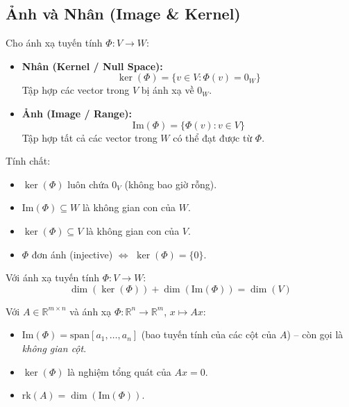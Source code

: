 \documentclass[12pt,a4paper]{article}
\begin{document}
\subsection{Ảnh và Nhân (Image \& Kernel)}

\begin{dinhnghia}
Cho ánh xạ tuyến tính $\Phi : V \to W$:
\begin{itemize}
  \item \textbf{Nhân (Kernel / Null Space):}
  \[
    \ker(\Phi) = \{v \in V : \Phi(v) = 0_W\}
  \]
  Tập hợp các vector trong $V$ bị ánh xạ về $0_W$.
  \item \textbf{Ảnh (Image / Range):}
  \[
    \mathrm{Im}(\Phi) = \{\Phi(v) : v \in V\}
  \]
  Tập hợp tất cả các vector trong $W$ có thể đạt được từ $\Phi$.
\end{itemize}
\end{dinhnghia}

\begin{dinhly}
Tính chất:
\begin{itemize}
  \item $\ker(\Phi)$ luôn chứa $0_V$ (không bao giờ rỗng).
  \item $\mathrm{Im}(\Phi) \subseteq W$ là không gian con của $W$.
  \item $\ker(\Phi) \subseteq V$ là không gian con của $V$.
  \item $\Phi$ đơn ánh (injective) $\Leftrightarrow$ $\ker(\Phi) = \{0\}$.
\end{itemize}
\end{dinhly}

\begin{dinhly}[title={Định lý hạng -- nhân (Rank-Nullity Theorem)}]
Với ánh xạ tuyến tính $\Phi : V \to W$:
\[
  \dim(\ker(\Phi)) + \dim(\mathrm{Im}(\Phi)) = \dim(V)
\]
\end{dinhly}

\begin{luuy}
Với $A \in \mathbb{R}^{m \times n}$ và ánh xạ $\Phi : \mathbb{R}^n \to \mathbb{R}^m$, $x \mapsto Ax$:
\begin{itemize}
  \item $\mathrm{Im}(\Phi) = \mathrm{span}[a_1, \ldots, a_n]$ (bao tuyến tính của các cột của $A$) -- còn gọi là \emph{không gian cột}.
  \item $\ker(\Phi)$ là nghiệm tổng quát của $Ax = 0$.
  \item $\mathrm{rk}(A) = \dim(\mathrm{Im}(\Phi))$.
\end{itemize}
\end{luuy}
\end{document}
